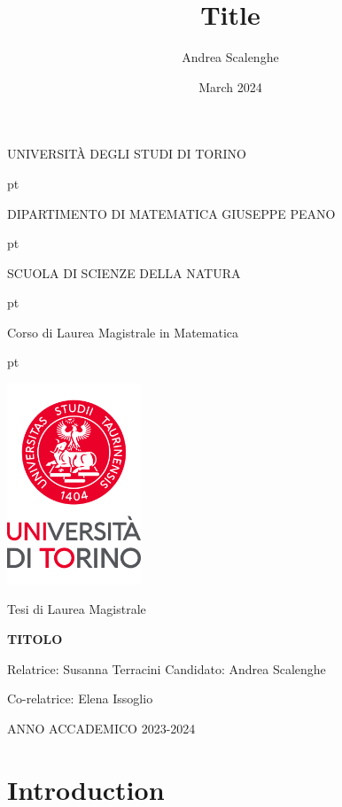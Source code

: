 \documentclass[12pt,a4paper]{book}
\title{Title}
\author{Andrea Scalenghe}
\date{March 2024}
\numberwithin{theorem}{section}
\numberwithin{definition}{section}
\numberwithin{example}{section}
\numberwithin{exercise}{section}
\begin{document}
\thispagestyle{empty}

\centerline {\Large{\textsc{ UNIVERSIT\`A DEGLI STUDI DI TORINO}}}
 pt

\centerline {\Large{\textsc DIPARTIMENTO DI MATEMATICA GIUSEPPE PEANO}}

 pt

\centerline {{\textsc SCUOLA DI SCIENZE DELLA NATURA}}

 pt

\centerline {\Large{\textsc Corso di Laurea Magistrale in Matematica}}
 pt





\centerline {\includegraphics[width=4cm]{logo_new_2022.png}}

\vskip 1.2cm

\centerline {\normalsize {Tesi di Laurea  Magistrale}} 

\vskip 0.7cm

\centerline {\Large {\bf TITOLO}}

\vskip 1.7cm

\noindent Relatrice: Susanna Terracini
\hfill  {Candidato: Andrea Scalenghe}

\noindent Co-relatrice: Elena Issoglio


\vskip 2.7cm


\centerline{ANNO ACCADEMICO 2023-2024}


\newpage

{\hypersetup{linkbordercolor=black, hidelinks}
\tableofcontents
}
\newpage

\hypersetup{colorlinks, linkcolor = gray, citecolor = gray, hidelinks}

\chapter{Introduction}
\end{document}
